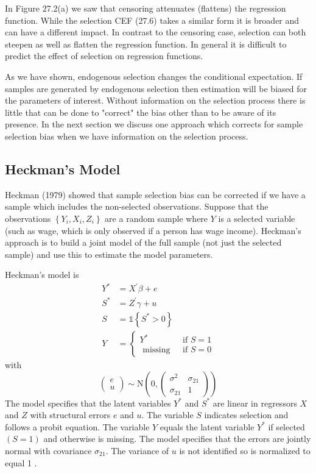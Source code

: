 \documentclass[10pt]{article}
\begin{document}
In Figure 27.2(a) we saw that censoring attenuates (flattens) the regression function. While the selection CEF (27.6) takes a similar form it is broader and can have a different impact. In contrast to the censoring case, selection can both steepen as well as flatten the regression function. In general it is difficult to predict the effect of selection on regression functions.

As we have shown, endogenous selection changes the conditional expectation. If samples are generated by endogenous selection then estimation will be biased for the parameters of interest. Without information on the selection process there is little that can be done to "correct" the bias other than to be aware of its presence. In the next section we discuss one approach which corrects for sample selection bias when we have information on the selection process.

\subsection{Heckman's Model}
Heckman (1979) showed that sample selection bias can be corrected if we have a sample which includes the non-selected observations. Suppose that the observations $\left\{Y_{i}, X_{i}, Z_{i}\right\}$ are a random sample where $Y$ is a selected variable (such as wage, which is only observed if a person has wage income). Heckman's approach is to build a joint model of the full sample (not just the selected sample) and use this to estimate the model parameters.

Heckman's model is
$$
\begin{aligned}
Y^{*} &=X^{\prime} \beta+e \\
S^{*} &=Z^{\prime} \gamma+u \\
S &=\mathbb{1}\left\{S^{*}>0\right\} \\
Y &=\left\{\begin{array}{cc}
Y^{*} & \text { if } S=1 \\
\text { missing } & \text { if } S=0
\end{array}\right.
\end{aligned}
$$
with
$$
\left(\begin{array}{c}
e \\
u
\end{array}\right) \sim \mathrm{N}\left(0,\left(\begin{array}{cc}
\sigma^{2} & \sigma_{21} \\
\sigma_{21} & 1
\end{array}\right)\right)
$$
The model specifies that the latent variables $Y^{*}$ and $S^{*}$ are linear in regressors $X$ and $Z$ with structural errors $e$ and $u$. The variable $S$ indicates selection and follows a probit equation. The variable $Y$ equals the latent variable $Y^{*}$ if selected $(S=1)$ and otherwise is missing. The model specifies that the errors are jointly normal with covariance $\sigma_{21}$. The variance of $u$ is not identified so is normalized to equal 1 .
\end{document}
